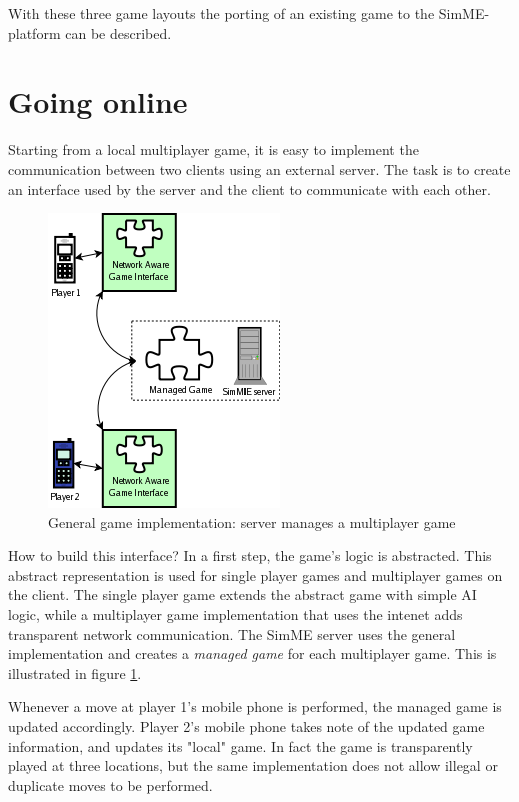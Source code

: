 	With these three game layouts the porting of an existing game to the
	SimME-platform can be described.


\section{Going online} \label{sec:going_online}

	Starting from a local multiplayer game, it is easy to implement the
	communication between two clients using an external server. The task is to
	create an interface used by the server and the client to communicate with
	each other.
	
	\begin{figure}[h]
	\begin{center}
		\includegraphics{pics/interface-usage.png}
		\caption{General game implementation: server manages a multiplayer game}
		\label{fig:interface}
	\end{center}
	\end{figure}

	How to build this interface? In a first step, the game's logic is
	abstracted. This abstract representation is used for single player games and
	multiplayer games on the client. The single player game extends the abstract
	game with simple AI logic, while a multiplayer game implementation that uses
	the intenet adds transparent network communication. The SimME server uses
	the general implementation and creates a \emph{managed game} for each
	multiplayer game. This is illustrated in figure \ref{fig:interface}.

	Whenever a move at player 1's mobile phone is performed, the managed game is
	updated accordingly. Player 2's mobile phone takes note of the updated game
	information, and updates its "local" game. In fact the game is transparently
	played at three locations, but the same implementation does not allow
	illegal or duplicate moves to be performed.

